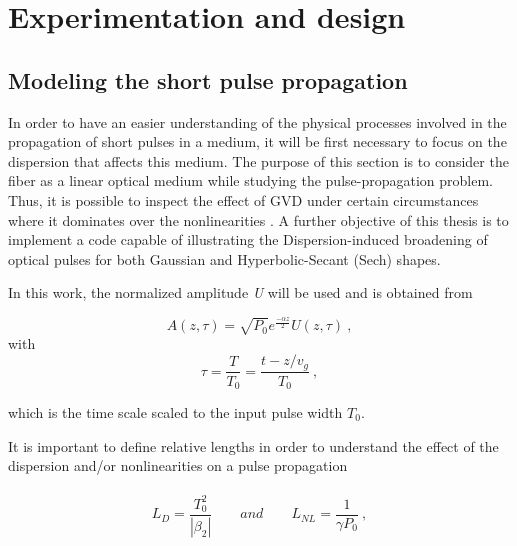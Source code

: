 \chapter{Experimentation and design}



 \section{Modeling the short  pulse propagation}
    In order to have an easier understanding of the physical processes involved in the propagation of short pulses in a medium, it will be first necessary to focus on the dispersion that affects this medium. The purpose of this section is to consider the fiber as a linear optical medium while studying the pulse-propagation problem. Thus, it is possible to inspect the effect of GVD under certain circumstances where it dominates over the nonlinearities \citep{ AgrawalBook}. A further objective of this thesis is to implement a code capable of illustrating the Dispersion-induced broadening of optical pulses for both Gaussian and Hyperbolic-Secant (Sech) shapes.


    In this work, the normalized amplitude \emph{U} will be used and is obtained from  
  
            \begin{equation}\label{eq_A0}
                A(z,\tau ) = \sqrt{P_0}e^{\frac{-\alpha z}{2}} U(z,\tau) \ ,
            \end{equation}
            with
            \begin{equation}
                \tau =  \frac{T}{T_0} = \frac{t-z/v_g}{T_0} \ ,
            \end{equation}
        
        which is the time scale scaled to the input pulse width $T_0$.
        
        
        It is important to define relative lengths in order to understand the effect of the dispersion and/or nonlinearities on a pulse propagation
            \ \\
            \ \\
            \begin{equation}
                L_D = \frac{T^2_0}{|\beta_2|} \qquad and \qquad L_{NL} = \frac{1}{\gamma P_0} \ ,
            \end{equation}
        
